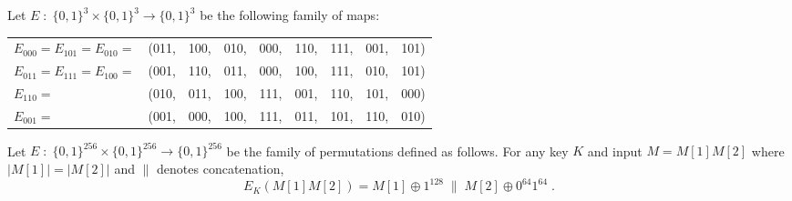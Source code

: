 \documentclass{exam}
\newcommand{\Colon}{\;:\;}
\newcommand{\bits}{\{0,1\}}
\newcommand{\ConsE}{\mathsf{Cons}_E}
\begin{document}
\begin{questions}
  \bigskip
  
  \question Let $E \Colon \bits^3 \times \bits^3 \rightarrow \bits^3$ be the following family of maps:
  \begin{center}
    \begin{small}
      \begin{tabular}{lllllllll}
        $E_{000} = E_{101} = E_{010} = $& (011,& 100, & 010, & 000, & 110, & 111, & 001, & 101) \\
        $E_{011} = E_{111} = E_{100} = $& (001,& 110, & 011, & 000, & 100, & 111, & 010, & 101) \\
        $E_{110} = $& (010,& 011, & 100, & 111, & 001, & 110, & 101, & 000) \\
        $E_{001} = $& (001,& 000, & 100, & 111, & 011, & 101, & 110, & 010) 
      \end{tabular}
    \end{small}%
  \end{center}


  \bigskip
  \question Let $E \Colon \bits^{256} \times \bits^{256} \rightarrow \bits^{256}$ be the family of permutations defined as follows. For any key $K$ and input $M = M[1]M[2]$ where $|M[1]| = |M[2]|$ and $\|$ denotes concatenation,
  \[ E_K(M[1]M[2]) = M[1] \oplus 1^{128} \; \| \; M[2]  \oplus 0^{64}1^{64} \;.\]


\end{questions}
\end{document}

